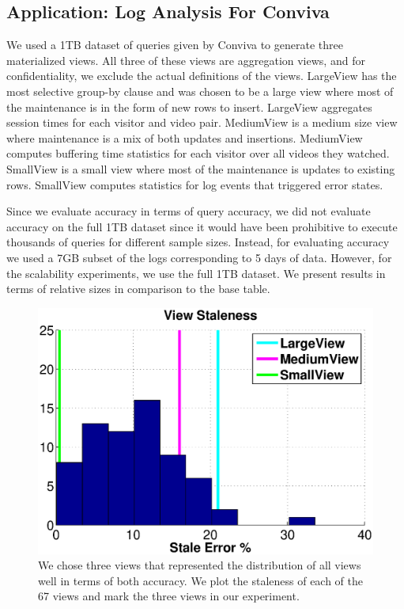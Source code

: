 \subsection{Application: Log Analysis For Conviva}
We used a 1TB dataset of queries given by Conviva to generate three materialized views.
All three of these views are aggregation views, and for confidentiality, we exclude the actual definitions of the views.
LargeView has the most selective group-by clause and was chosen to be a large view where most of the maintenance is in the form of new rows to insert.
LargeView aggregates session times for each visitor and video pair.
MediumView is a medium size view where maintenance is a mix of both updates and insertions.
MediumView computes buffering time statistics for each visitor over all videos they watched.
SmallView is a small view where most of the maintenance is updates to existing rows.
SmallView computes statistics for log events that triggered error states.

Since we evaluate accuracy in terms of query accuracy, we did not evaluate accuracy on the full 1TB dataset since it would have been prohibitive to execute thousands of queries for different sample sizes. 
Instead, for evaluating accuracy we used a 7GB subset of the logs corresponding to 5 days of data.
However, for the scalability experiments, we use the full 1TB dataset.
We present results in terms of relative sizes in comparison to the base table.

\begin{figure}[t]\vspace{-1em} 
\centering
\vspace{-0.75em}
\includegraphics[scale=0.23]{exp/conviva_efficiency_accuracy.eps}\vspace{-.5em}
 \caption{We chose three views that represented the distribution of all views well in terms of both accuracy. We plot the staleness of each of the 67 views and mark the three views in our experiment.\label{exp12conviva}}\vspace{-1em}
\end{figure}

